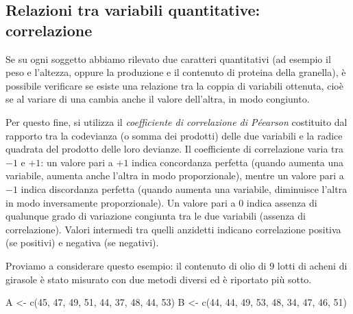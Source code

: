 \documentclass[a4paper,12pt,oneside]{book}
\newenvironment{Shaded}{\begin{snugshade}}{\end{snugshade}}
\newcommand{\DecValTok}[1]{#1}
\newcommand{\OtherTok}[1]{#1}
\newcommand{\FunctionTok}[1]{#1}
\newcommand{\NormalTok}[1]{#1}
\begin{document}
\hypertarget{relazioni-tra-variabili-quantitative-correlazione}{%
\subsection{Relazioni tra variabili quantitative: correlazione}\label{relazioni-tra-variabili-quantitative-correlazione}}

Se su ogni soggetto abbiamo rilevato due caratteri quantitativi (ad esempio il peso e l'altezza, oppure la produzione e il contenuto di proteina della granella), è possibile verificare se esiste una relazione tra la coppia di variabili ottenuta, cioè se al variare di una cambia anche il valore dell'altra, in modo congiunto.

Per questo fine, si utilizza il \emph{coefficiente di correlazione di Péearson} costituito dal rapporto tra la codevianza (o somma dei prodotti) delle due variabili e la radice quadrata del prodotto delle loro devianze. Il coefficiente di correlazione varia tra \(-1\) e \(+1\): un valore pari a \(+1\) indica concordanza perfetta (quando aumenta una variabile, aumenta anche l'altra in modo proporzionale), mentre un valore pari a \(-1\) indica discordanza perfetta (quando aumenta una variabile, diminuisce l'altra in modo inversamente proporzionale). Un valore pari a \(0\) indica assenza di qualunque grado di variazione congiunta tra le due variabili (assenza di correlazione). Valori intermedi tra quelli anzidetti indicano correlazione positiva (se positivi) e negativa (se negativi).

Proviamo a considerare questo esempio: il contenuto di olio di 9 lotti di acheni di girasole è stato misurato con due metodi diversi ed è riportato più sotto.

\begin{Shaded}
\begin{Highlighting}[]
\NormalTok{A }\OtherTok{\textless{}{-}} \FunctionTok{c}\NormalTok{(}\DecValTok{45}\NormalTok{, }\DecValTok{47}\NormalTok{, }\DecValTok{49}\NormalTok{, }\DecValTok{51}\NormalTok{, }\DecValTok{44}\NormalTok{, }\DecValTok{37}\NormalTok{, }\DecValTok{48}\NormalTok{, }\DecValTok{44}\NormalTok{, }\DecValTok{53}\NormalTok{)}
\NormalTok{B }\OtherTok{\textless{}{-}} \FunctionTok{c}\NormalTok{(}\DecValTok{44}\NormalTok{, }\DecValTok{44}\NormalTok{, }\DecValTok{49}\NormalTok{, }\DecValTok{53}\NormalTok{, }\DecValTok{48}\NormalTok{, }\DecValTok{34}\NormalTok{, }\DecValTok{47}\NormalTok{, }\DecValTok{46}\NormalTok{, }\DecValTok{51}\NormalTok{)}
\end{Highlighting}
\end{Shaded}
\end{document}
